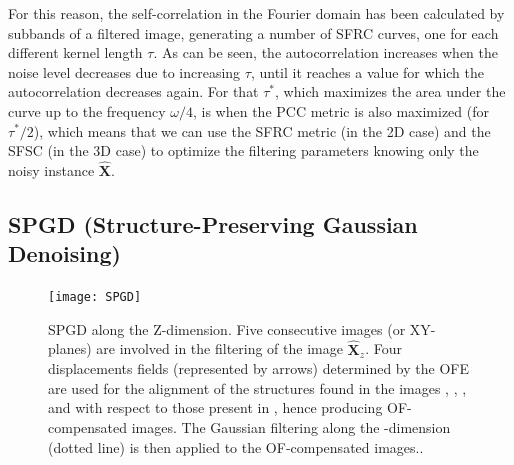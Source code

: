 \documentclass{article}
\begin{document}
For this reason, the self-correlation in the Fourier domain has been
calculated by subbands of a filtered image, generating a number of
SFRC curves, one for each different kernel length $\tau$. As can be
seen, the autocorrelation increases when the noise level decreases due
to increasing $\tau$, until it reaches a value for which the
autocorrelation decreases again. For that $\tau^*$, which maximizes
the area under the curve up to the frequency $\omega/4$, is
when the PCC metric is also maximized (for $\tau^*/2$), which means
that we can use the SFRC metric (in the 2D case) and the SFSC (in the
3D case) to optimize the filtering parameters knowing only the noisy
instance $\hat{\mathbf{X}}$.

\subsection{SPGD (Structure-Preserving Gaussian Denoising) \cite{gonzalez2023structure}}

\begin{figure}
  \centering
  \texttt{[image: SPGD]}
  \caption{SPGD along the $\mathrm{Z}$-dimension. Five consecutive
    images (or $\mathrm{XY}$-planes) are involved in the filtering of
    the image $\hat{\mathbf{X}}_z$. Four displacements fields
    (represented by arrows) determined by the OFE are used for the
    alignment of the structures found in the images , , , and with
    respect to those present in , hence producing OF-compensated
    images. The Gaussian filtering along the -dimension (dotted line)
    is then applied to the OF-compensated images..\label{fig:SPGD}}
\end{figure}
\end{document}
